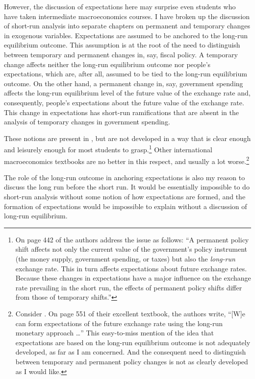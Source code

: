 \documentclass[
  letterpaper,
]{book}
\theoremstyle{plain}
\theoremstyle{remark}
\begin{document}
However, the discussion of expectations here may surprise even students
who have taken intermediate macroeconomics courses. I have broken up the
discussion of short-run analysis into separate chapters on permanent and
temporary changes in exogenous variables. Expectations are assumed to be
anchored to the long-run equilibrium outcome. This assumption is at the
root of the need to distinguish between temporary and permanent changes
in, say, fiscal policy. A temporary change affects neither the long-run
equilibrium outcome nor people's expectations, which are, after all,
assumed to be tied to the long-run equilibrium outcome. On the other
hand, a permanent change in, say, government spending affects the
long-run equilibrium level of the future value of the exchange rate and,
consequently, people's expectations about the future value of the
exchange rate. This change in expectations has short-run ramifications
that are absent in the analysis of temporary changes in government
spending.

These notions are present in \textcite{krugman2022international}, but
are not developed in a way that is clear enough and leisurely enough for
most students to grasp.\footnote{On page 442 of
  \textcite{krugman2022international} the authors address the issue as
  follows: ``A permanent policy shift affects not only the current value
  of the government's policy instrument (the money supply, government
  spending, or taxes) but also the \emph{long-run} exchange rate. This
  in turn affects expectations about future exchange rates. Because
  these changes in expectations have a major influence on the exchange
  rate prevailing in the short run, the effects of permanent policy
  shifts differ from those of temporary shifts.''} Other international
macroeconomics textbooks are no better in this respect, and usually a
lot worse.\footnote{Consider \textcite{feenstra2008international}. On
  page 551 of their excellent textbook, the authors write, ``{[}W{]}e
  can form expectations of the future exchange rate using the long-run
  monetary approach \ldots{}'' This easy-to-miss mention of the idea
  that expectations are based on the long-run equilibrium outcome is not
  adequately developed, as far as I am concerned. And the consequent
  need to distinguish between temporary and permanent policy changes is
  not as clearly developed as I would like.}

The role of the long-run outcome in anchoring expectations is also my
reason to discuss the long run before the short run. It would be
essentially impossible to do short-run analysis without some notion of
how expectations are formed, and the formation of expectations would be
impossible to explain without a discussion of long-run equilibrium.
\end{document}
